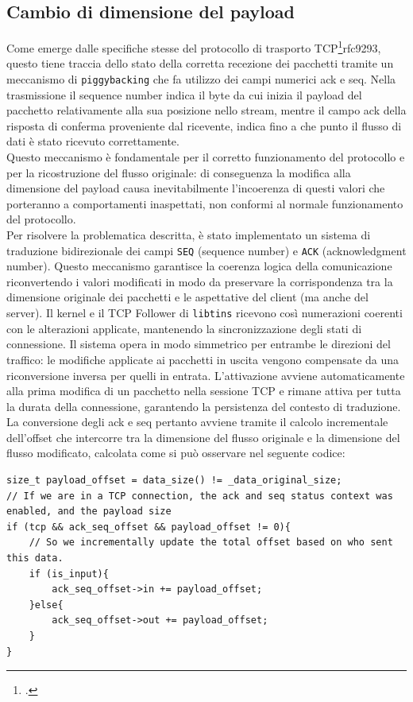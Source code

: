 \subsection{Cambio di dimensione del payload}

Come emerge dalle specifiche stesse del protocollo di trasporto TCP\footcite{RFC9293, Transmission Control Protocol (TCP)}{rfc9293}, questo tiene traccia
dello stato della corretta recezione dei pacchetti tramite un meccanismo di \texttt{piggybacking} che fa utilizzo dei campi numerici ack e seq.
Nella trasmissione il sequence number indica il byte da cui inizia il payload del pacchetto relativamente alla sua posizione nello stream, mentre il campo ack della risposta
di conferma proveniente dal ricevente, indica fino a che punto il flusso di dati è stato ricevuto correttamente.\\
Questo meccanismo è fondamentale per il corretto funzionamento del protocollo e per la ricostruzione del flusso originale:
di conseguenza la modifica alla dimensione del payload causa inevitabilmente l'incoerenza di questi valori che porteranno a comportamenti inaspettati, non conformi al 
normale funzionamento del protocollo.\\

Per risolvere la problematica descritta, è stato implementato un sistema di traduzione bidirezionale dei campi \texttt{SEQ} (sequence number) e \texttt{ACK} (acknowledgment number).
Questo meccanismo garantisce la coerenza logica della comunicazione riconvertendo i valori modificati in modo da preservare la corrispondenza tra la dimensione originale dei pacchetti e le aspettative del client (ma anche del server).
Il kernel e il TCP Follower di \texttt{libtins} ricevono così numerazioni coerenti con le alterazioni applicate, mantenendo la sincronizzazione degli stati di connessione.
Il sistema opera in modo simmetrico per entrambe le direzioni del traffico: le modifiche applicate ai pacchetti in uscita vengono compensate da una riconversione inversa per quelli in entrata.
L'attivazione avviene automaticamente alla prima modifica di un pacchetto nella sessione TCP e rimane attiva per tutta la durata della connessione, garantendo la persistenza del contesto di traduzione.\\
La conversione degli ack e seq pertanto avviene tramite il calcolo incrementale dell'offset che intercorre tra la dimensione del flusso originale e la dimensione del flusso modificato,
calcolata come si può osservare nel seguente codice:

\begin{listing}[H]
    \begin{verbatim}
size_t payload_offset = data_size() != _data_original_size;
// If we are in a TCP connection, the ack and seq status context was enabled, and the payload size 
if (tcp && ack_seq_offset && payload_offset != 0){
    // So we incrementally update the total offset based on who sent this data.
    if (is_input){
        ack_seq_offset->in += payload_offset;
    }else{
        ack_seq_offset->out += payload_offset;
    }
}
\end{verbatim}
\end{listing}

